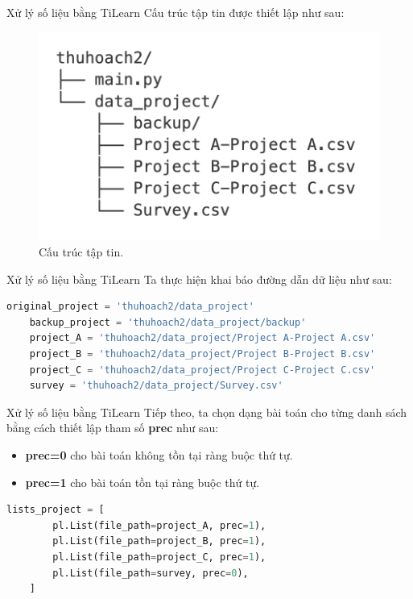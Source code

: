 \documentclass[10pt]{beamer}
\begin{document}
\begin{frame}{Xử lý số liệu bằng TiLearn}
Cấu trúc tập tin được thiết lập như sau:
\medskip
\begin{figure}[h]
\centering
\includegraphics[width=0.6\linewidth]{project_nt.png}
\caption{Cấu trúc tập tin.}
\end{figure}
\end{frame}

\begin{frame}[fragile]{Xử lý số liệu bằng TiLearn}
Ta thực hiện khai báo đường dẫn dữ liệu như sau:
\begin{lstlisting}[language=Python]
    original_project = 'thuhoach2/data_project'
    backup_project = 'thuhoach2/data_project/backup'
    project_A = 'thuhoach2/data_project/Project A-Project A.csv'
    project_B = 'thuhoach2/data_project/Project B-Project B.csv'
    project_C = 'thuhoach2/data_project/Project C-Project C.csv'
    survey = 'thuhoach2/data_project/Survey.csv'
\end{lstlisting}
\end{frame}

\begin{frame}[fragile]{Xử lý số liệu bằng TiLearn}
Tiếp theo, ta chọn dạng bài toán cho từng danh sách bằng cách thiết lập tham số \textbf{prec} như sau:
    
\begin{itemize}
\item \textbf{prec=0} cho bài toán không tồn tại ràng buộc thứ tự.
\item \textbf{prec=1} cho bài toán tồn tại ràng buộc thứ tự.
\end{itemize}

\begin{lstlisting}[language=Python]
    lists_project = [
        pl.List(file_path=project_A, prec=1),
        pl.List(file_path=project_B, prec=1),
        pl.List(file_path=project_C, prec=1),
        pl.List(file_path=survey, prec=0),
    ]
\end{lstlisting}
\end{frame}
\end{document}
